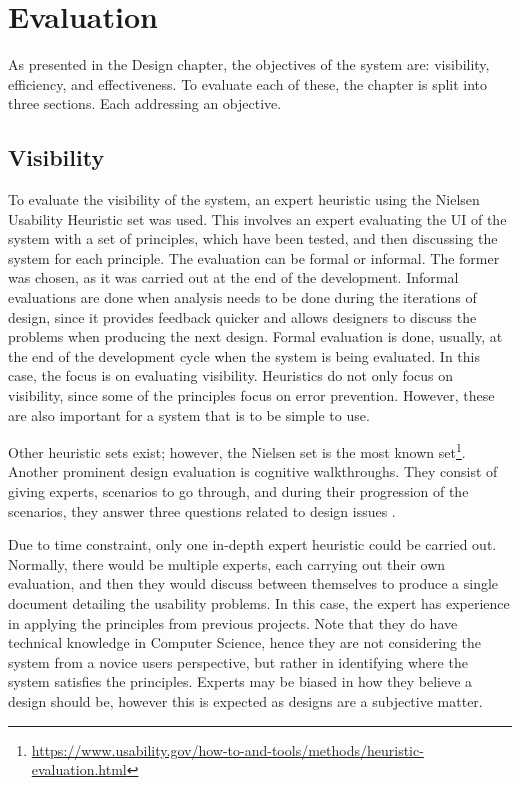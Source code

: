 \chapter{Evaluation}
\par As presented in the Design chapter, the objectives of the system are: visibility, efficiency, and effectiveness. To evaluate each of these, the chapter is split into three sections. Each addressing an objective.

\section{Visibility}
\par To evaluate the visibility of the system, an expert heuristic using the Nielsen Usability Heuristic \cite{nielsen1995} set was used. This involves an expert evaluating the UI of the system with a set of principles, which have been tested, and then discussing the system for each principle. The evaluation can be formal or informal. The former was chosen, as it was carried out at the end of the development. Informal evaluations are done when analysis needs to be done during the iterations of design, since it provides feedback quicker and allows designers to discuss the problems when producing the next design. Formal evaluation is done, usually, at the end of the development cycle when the system is being evaluated. In this case, the focus is on evaluating visibility. Heuristics do not only focus on visibility, since some of the principles focus on error prevention. However, these are also important for a system that is to be simple to use.

\par Other heuristic sets exist; however, the Nielsen set is the most known set\footnote{\url{https://www.usability.gov/how-to-and-tools/methods/heuristic-evaluation.html}}. Another prominent design evaluation is cognitive walkthroughs. They consist of giving experts, scenarios to go through, and during their progression of the scenarios, they answer three questions related to design issues \cite{whartonriemanlewispolson1994}.

\par Due to time constraint, only one in-depth expert heuristic could be carried out. Normally, there would be multiple experts, each carrying out their own evaluation, and then they would discuss between themselves to produce a single document detailing the usability problems. In this case, the expert has experience in applying the principles from previous projects. Note that they do have technical knowledge in Computer Science, hence they are not considering the system from a novice users perspective, but rather in identifying where the system satisfies the principles. Experts may be biased in how they believe a design should be, however this is expected as designs are a subjective matter.

